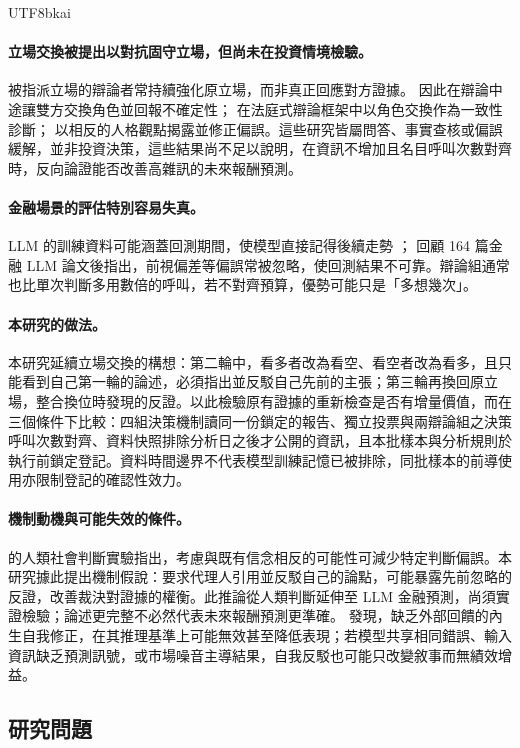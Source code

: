 \documentclass[12pt,a4paper]{article}
\begin{document}
\begin{CJK}{UTF8}{bkai}
\paragraph{立場交換被提出以對抗固守立場，但尚未在投資情境檢驗。}
被指派立場的辯論者常持續強化原立場，而非真正回應對方證據。\citet{liu2025roleswitch} 因此在辯論中途讓雙方交換角色並回報不確定性；\citet{chowdhury2026proclaim} 在法庭式辯論框架中以角色交換作為一致性診斷；\citet{chen2026mpt} 以相反的人格觀點揭露並修正偏誤。這些研究皆屬問答、事實查核或偏誤緩解，並非投資決策，這些結果尚不足以說明，在資訊不增加且名目呼叫次數對齊時，反向論證能否改善高雜訊的未來報酬預測。

\paragraph{金融場景的評估特別容易失真。}
LLM 的訓練資料可能涵蓋回測期間，使模型直接記得後續走勢 \citep{glasserman2023lookahead}；\citet{kong2026bias} 回顧 164 篇金融 LLM 論文後指出，前視偏差等偏誤常被忽略，使回測結果不可靠。辯論組通常也比單次判斷多用數倍的呼叫，若不對齊預算，優勢可能只是「多想幾次」。

\paragraph{本研究的做法。}
本研究延續立場交換的構想：第二輪中，看多者改為看空、看空者改為看多，且只能看到自己第一輪的論述，必須指出並反駁自己先前的主張；第三輪再換回原立場，整合換位時發現的反證。以此檢驗原有證據的重新檢查是否有增量價值，而在三個條件下比較：四組決策機制讀同一份鎖定的報告、獨立投票與兩辯論組之決策呼叫次數對齊、資料快照排除分析日之後才公開的資訊，且本批樣本與分析規則於執行前鎖定登記。資料時間邊界不代表模型訓練記憶已被排除，同批樣本的前導使用亦限制登記的確認性效力。

\paragraph{機制動機與可能失效的條件。}
\citet{lord1984opposite} 的人類社會判斷實驗指出，考慮與既有信念相反的可能性可減少特定判斷偏誤。本研究據此提出機制假說：要求代理人引用並反駁自己的論點，可能暴露先前忽略的反證，改善裁決對證據的權衡。此推論從人類判斷延伸至 LLM 金融預測，尚須實證檢驗；論述更完整不必然代表未來報酬預測更準確。\citet{huang2024selfcorrect} 發現，缺乏外部回饋的內生自我修正，在其推理基準上可能無效甚至降低表現；若模型共享相同錯誤、輸入資訊缺乏預測訊號，或市場噪音主導結果，自我反駁也可能只改變敘事而無績效增益。

\subsection{研究問題}


\end{CJK}
\end{document}
